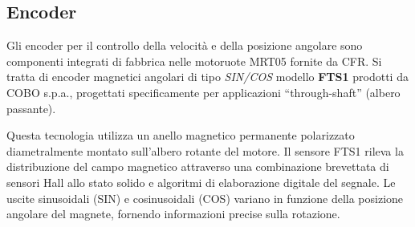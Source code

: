 \subsection{Encoder}

Gli encoder per il controllo della velocità e della posizione angolare sono componenti integrati di fabbrica nelle motoruote MRT05 fornite da CFR. Si tratta di encoder magnetici angolari di tipo \textit{SIN/COS} modello \textbf{FTS1} prodotti da COBO s.p.a., progettati specificamente per applicazioni ``through-shaft'' (albero passante).

Questa tecnologia utilizza un anello magnetico permanente polarizzato diametralmente montato sull'albero rotante del motore. Il sensore FTS1 rileva la distribuzione del campo magnetico attraverso una combinazione brevettata di sensori Hall allo stato solido e algoritmi di elaborazione digitale del segnale. Le uscite sinusoidali (SIN) e cosinusoidali (COS) variano in funzione della posizione angolare del magnete, fornendo informazioni precise sulla rotazione.

